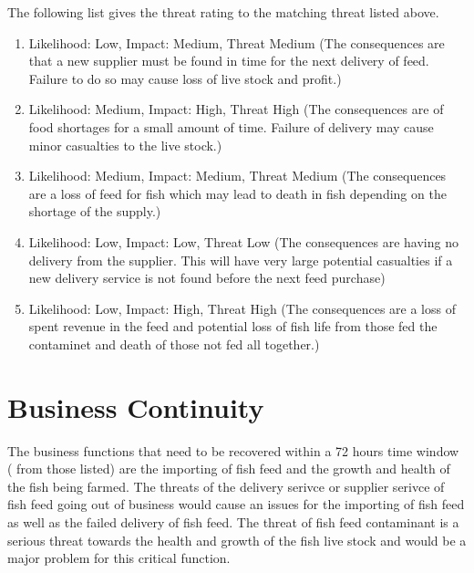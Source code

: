 \documentclass[paper=a4, fontsize=11pt]{scrartcl} %
\numberwithin{equation}{section} %
\numberwithin{figure}{section} %
\numberwithin{table}{section} %
\begin{document}
The following list gives the threat rating to the matching threat listed above.

\begin{enumerate}

\item Likelihood: Low, Impact: Medium, Threat Medium (The consequences are that a new
supplier must be found in time for the next delivery of feed. Failure to do so may cause
loss of live stock and profit.)
\item Likelihood: Medium, Impact: High, Threat High (The consequences are of food 
shortages for a small amount of time. Failure of delivery may cause minor casualties
to the live stock.)
\item Likelihood: Medium, Impact: Medium, Threat Medium (The consequences are a loss
of feed for fish which may lead to death in fish depending on the shortage of the
supply.)
\item Likelihood: Low, Impact: Low, Threat Low (The consequences are having no delivery
from the supplier. This will have very large potential casualties if a new delivery 
service is not found before the next feed purchase)
\item Likelihood: Low, Impact: High, Threat High (The consequences are a loss of 
spent revenue in the feed and potential loss of fish life from those fed the contaminet
and death of those not fed all together.)

\end{enumerate}




\section{Business Continuity}

The business functions that need to be recovered within a 72 hours time window (
from those listed) are the importing of fish feed and the growth and health of 
the fish being farmed. The threats of the delivery serivce or supplier serivce of fish
feed going out of business would cause an issues for the importing of fish feed as
well as the failed delivery of fish feed. The threat of fish feed contaminant is a
serious threat towards the health and growth of the fish live stock and would be a
major problem for this critical function.\\
\end{document}
